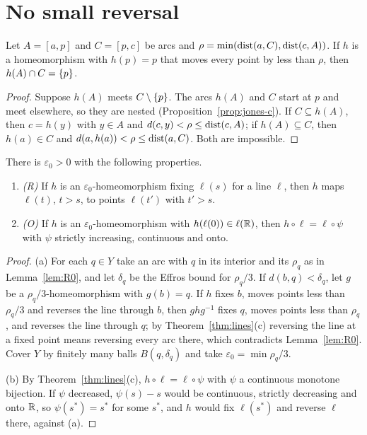 \section{No small reversal}\label{sec:reversal}

\begin{lemma}[(R0)]\label{lem:R0}
Let $A=[a,p]$ and $C=[p,c]$ be arcs and $\rho=\min(\operatorname{dist}(a,C),\operatorname{dist}(c,A))$. If $h$ is a homeomorphism with $h(p)=p$ that moves every
point by less than $\rho$, then $h(A)\cap C=\left\{ p \right\}$.
\end{lemma}

\begin{proof}
Suppose $h(A)$ meets $C\setminus\left\{ p \right\}$. The arcs $h(A)$ and $C$ start at $p$ and meet elsewhere, so they are nested
(Proposition~\ref{prop:jones-c}). If $C\subseteq h(A)$, then $c=h(y)$ with $y\in A$ and $d(c,y)<\rho\le\operatorname{dist}(c,A)$; if $h(A)\subseteq C$,
then $h(a)\in C$ and $d(a,h(a))<\rho\le\operatorname{dist}(a,C)$. Both are impossible.
\end{proof}


\begin{theorem}[(R) and (O)]\label{thm:RO}
There is $\varepsilon_0>0$ with the following properties.
\begin{enumerate}[label=(\alph*)]
\item \emph{(R)} If $h$ is an $\varepsilon_0$-homeomorphism fixing $\ell(s)$ for a line $\ell$, then $h$ maps $\ell(t)$, $t>s$, to points
$\ell(t')$ with $t'>s$.
\item \emph{(O)} If $h$ is an $\varepsilon_0$-homeomorphism with $h(\ell(0))\in\ell(\mathbb{R})$, then $h\circ\ell=\ell\circ\psi$ with $\psi$ strictly
increasing, continuous and onto.
\end{enumerate}
\end{theorem}

\begin{proof}
(a) For each $q\in Y$ take an arc with $q$ in its interior and its $\rho_q$ as in Lemma~\ref{lem:R0}, and let $\delta_q$ be the
Effros bound for $\rho_q/3$. If $d(b,q)<\delta_q$, let $g$ be a $\rho_q/3$-homeomorphism with $g(b)=q$. If $h$ fixes $b$, moves points
less than $\rho_q/3$ and reverses the line through $b$, then $ghg^{-1}$ fixes $q$, moves points less than $\rho_q$, and reverses
the line through $q$; by Theorem~\ref{thm:lines}(c) reversing the line at a fixed point means reversing every arc there,
which contradicts Lemma~\ref{lem:R0}. Cover $Y$ by finitely many balls $B(q,\delta_q)$ and take $\varepsilon_0=\min\rho_q/3$.

(b) By Theorem~\ref{thm:lines}(c), $h\circ\ell=\ell\circ\psi$ with $\psi$ a continuous monotone bijection. If $\psi$ decreased, $\psi(s)-s$ would be
continuous, strictly decreasing and onto $\mathbb{R}$, so $\psi(s^*)=s^*$ for some $s^*$, and $h$ would fix $\ell(s^*)$ and reverse $\ell$
there, against (a).
\end{proof}

